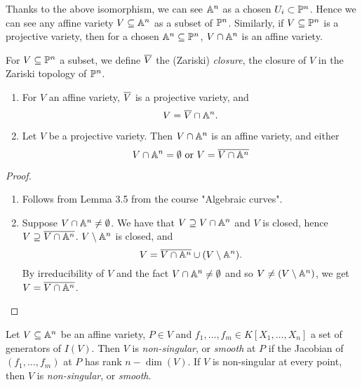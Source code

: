 \begin{notation}
	Thanks to the above isomorphism, we can see $\mathbb{A}^n$ as a chosen
	$U_i \subset \mathbb{P}^n$. Hence we can see any affine variety
	$V \subseteq \mathbb{A}^n$ as a subset of $\mathbb{P}^n$. Similarly, if $V \subseteq
	\mathbb{P}^n$ is a projective variety,
	then for a chosen $\mathbb{A}^n \subseteq \mathbb{P}^n$,
	$V \cap \mathbb{A}^n$ is an affine variety.
\end{notation}

\begin{definition}
	For $V \subseteq \mathbb{P}^n$ a subset, we define $\overline{V}$ the (Zariski)
	\emph{closure}, the closure of $V$ in the Zariski topology of $\mathbb{P}^n$.
\end{definition}

\begin{proposition}
	\begin{enumerate}
		\item For $V$ an affine variety, $\overline{V}$ is a projective variety, and
		\begin{equation*}
			V = \overline{V} \cap \mathbb{A}^n.
		\end{equation*}
		\item Let $V$ be a projective variety. Then $V \cap \mathbb{A}^n$ is an affine
			variety, and either
			\begin{equation*}
				V \cap \mathbb{A}^n = \emptyset
				\textrm{ or }
				V = \overline{V \cap \mathbb{A}^n}
			\end{equation*}
	\end{enumerate}
\end{proposition}

\begin{proof}
	\begin{enumerate}
		\item Follows from Lemma 3.5 from the course "Algebraic curves".
		\item Suppose $V \cap \mathbb{A}^n \neq \emptyset$. We have that
			$V \supseteq V \cap \mathbb{A}^n$ and $V$ is closed, hence
			$V \supseteq \overline{V \cap \mathbb{A}^n}$.
			$V \setminus \mathbb{A}^n$ is closed, and
			\begin{equation*}
				V = \overline{V \cap \mathbb{A}^n} \cup (V \setminus \mathbb{A}^n).
			\end{equation*}
			By irreducibility of $V$ and the fact $V \cap \mathbb{A}^n \neq \emptyset$
			and so $V \neq (V \setminus \mathbb{A}^n)$, we get $V = \overline{V \cap \mathbb{A}^n}$.
	\end{enumerate}
\end{proof}

\begin{definition}
	Let $V \subseteq \mathbb{A}^n$ be an affine variety, $P \in V$ and 
	$f_1, \dots, f_m \in K[X_1, \dots, X_n]$ a set of generators of $I(V)$.
	Then $V$ is \emph{non-singular}, or \emph{smooth} at $P$ if the Jacobian
	of $(f_1, \dots, f_m)$ at $P$ has rank $n - \dim(V)$.
	If $V$ is non-singular at every point, then $V$ is \emph{non-singular},
	or \emph{smooth}.
\end{definition}

